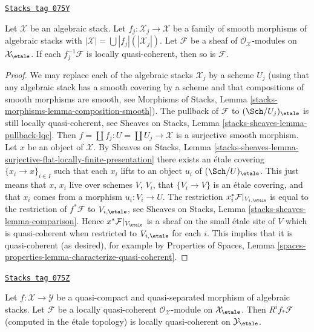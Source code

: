 \begin{lemma}
\label{stacks-cohomology-lemma-check-lqc-on-etale-covering}
\href{https://stacks.math.columbia.edu/tag/075Y}{\texttt{Stacks tag 075Y}}

Let $\mathcal{X}$ be an algebraic stack. Let
$f_j : \mathcal{X}_j \to \mathcal{X}$ be a family of smooth
morphisms of algebraic stacks with
$|\mathcal{X}| =\bigcup |f_j|(|\mathcal{X}_j|)$.
Let $\mathcal{F}$ be a sheaf of $\mathcal{O}_\mathcal{X}$-modules
on $\mathcal{X}_\etale$. If each $f_j^{-1}\mathcal{F}$
is locally quasi-coherent, then so is $\mathcal{F}$.
\end{lemma}

\begin{proof}
We may replace each of the algebraic stacks $\mathcal{X}_j$ by
a scheme $U_j$ (using that any algebraic stack has a smooth covering by
a scheme and that compositions of smooth morphisms are smooth, see
Morphisms of Stacks, Lemma \ref{stacks-morphisms-lemma-composition-smooth}).
The pullback of $\mathcal{F}$ to $(\Sch/U_j)_\etale$ is still
locally quasi-coherent, see
Sheaves on Stacks, Lemma \ref{stacks-sheaves-lemma-pullback-lqc}.
Then $f = \coprod f_j : U = \coprod U_j \to \mathcal{X}$ is a surjective
smooth morphism. Let $x$ be an object of $\mathcal{X}$. By
Sheaves on Stacks, Lemma
\ref{stacks-sheaves-lemma-surjective-flat-locally-finite-presentation}
there exists an \'etale covering $\{x_i \to x\}_{i \in I}$
such that each $x_i$ lifts to an object $u_i$ of $(\Sch/U)_\etale$.
This just means that $x$, $x_i$ live over schemes $V$, $V_i$, that
$\{V_i \to V\}$ is an \'etale covering, and that $x_i$ comes from
a morphism $u_i : V_i \to U$. The restriction
$x_i^*\mathcal{F}|_{V_{i, \etale}}$ is equal to the restriction
of $f^*\mathcal{F}$ to $V_{i, \etale}$, see
Sheaves on Stacks, Lemma \ref{stacks-sheaves-lemma-comparison}.
Hence $x^*\mathcal{F}|_{V_\etale}$
is a sheaf on the small \'etale site of $V$ which is quasi-coherent
when restricted to $V_{i, \etale}$ for each $i$.
This implies that it is quasi-coherent (as desired), for example by
Properties of Spaces, Lemma
\ref{spaces-properties-lemma-characterize-quasi-coherent}.
\end{proof}

\begin{lemma}
\label{stacks-cohomology-lemma-pushforward-locally-quasi-coherent}
\href{https://stacks.math.columbia.edu/tag/075Z}{\texttt{Stacks tag 075Z}}

Let $f : \mathcal{X} \to \mathcal{Y}$ be a quasi-compact and
quasi-separated morphism of algebraic stacks. Let
$\mathcal{F}$ be a locally quasi-coherent
$\mathcal{O}_\mathcal{X}$-module on $\mathcal{X}_\etale$.
Then $R^if_*\mathcal{F}$ (computed in the \'etale topology) is
locally quasi-coherent on $\mathcal{Y}_\etale$.
\end{lemma}

